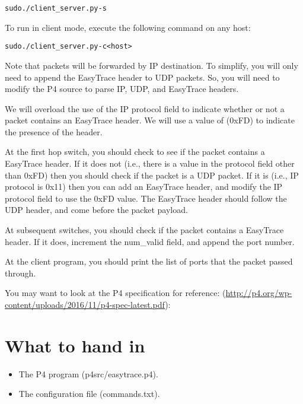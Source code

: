 \documentclass{article}
\begin{document}
 
\begin{alltt}
sudo ./client\_server.py -s
\end{alltt}

\noindent
 To run in client mode, execute the following command on any host:

\begin{alltt}
sudo ./client\_server.py -c <host>
\end{alltt}


\noindent
Note that packets will be forwarded by IP destination. To simplify, you will only need to append the
EasyTrace header to UDP packets. So, you will need to modify the P4 source
to parse IP, UDP, and EasyTrace headers.

We will overload the use of the IP protocol field
to indicate whether or not a packet contains an  EasyTrace header.
We will use a value of (0xFD) to indicate the presence of the header.

At the first hop switch, you should check to see if the packet
contains a EasyTrace header. If it does not (i.e., there is a value in
the protocol field other than 0xFD) then you should check if the
packet is a UDP packet. If it is (i.e., IP protocol is 0x11) then you can add an EasyTrace header, and
modify the IP protocol field to use the 0xFD value. The EasyTrace header should follow the UDP header, and
come before the packet payload.

At subsequent switches, you should check if the  packet contains a EasyTrace header. If it does,
increment the num\_valid field, and append the port number.

At the client program, you should print the list of ports that the packet passed through.

You may want to look at the P4 specification for reference:
  (\url{http://p4.org/wp-content/uploads/2016/11/p4-spec-latest.pdf}):



 \section*{What to hand in}
 \begin{itemize}
 \item The P4 program (p4src/easytrace.p4).
 \item The configuration file (commands.txt).
 \end{itemize}
\end{document}

